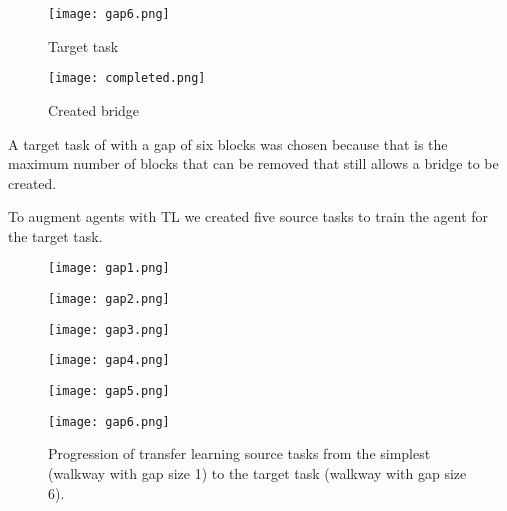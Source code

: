 \documentclass{article}
\begin{document}
\begin{figure}[H]
  \centering
  \begin{minipage}[b]{0.45\textwidth}
    \texttt{[image: gap6.png]}
    \caption{Target task}
  \end{minipage}
  \hfill
  \begin{minipage}[b]{0.45\textwidth}
    \texttt{[image: completed.png]}\label{figure:2}
    \caption{Created bridge}
  \end{minipage}
\end{figure}

A target task of with a gap of six blocks was chosen because that is the maximum number of blocks that can be removed that still allows a bridge to be created. 

To augment agents with TL we created five source tasks to train the agent for the target task.

\begin{figure}[H]
  \begin{center}
  \begin{minipage}[b]{0.328\linewidth}
    \texttt{[image: gap1.png]}
  \end{minipage}
  \hfill
  \begin{minipage}[b]{0.328\linewidth}
    \texttt{[image: gap2.png]}
  \end{minipage}
  \hfill
  \begin{minipage}[b]{0.328\linewidth}
    \texttt{[image: gap3.png]}
  \end{minipage}
  \end{center}
\end{figure}

\vspace{-23pt}

\begin{figure}[H]
  \begin{center}
  \begin{minipage}[b]{0.328\linewidth}
    \texttt{[image: gap4.png]}
  \end{minipage}
  \hfill
  \begin{minipage}[b]{0.328\linewidth}
    \texttt{[image: gap5.png]}
  \end{minipage}
  \hfill
  \begin{minipage}[b]{0.328\linewidth}
    \texttt{[image: gap6.png]}
  \end{minipage}
  \end{center}
  \caption{Progression of transfer learning source tasks from the simplest (walkway with gap size 1) to the target task (walkway with gap size 6).}
\end{figure}
 
\end{document}

